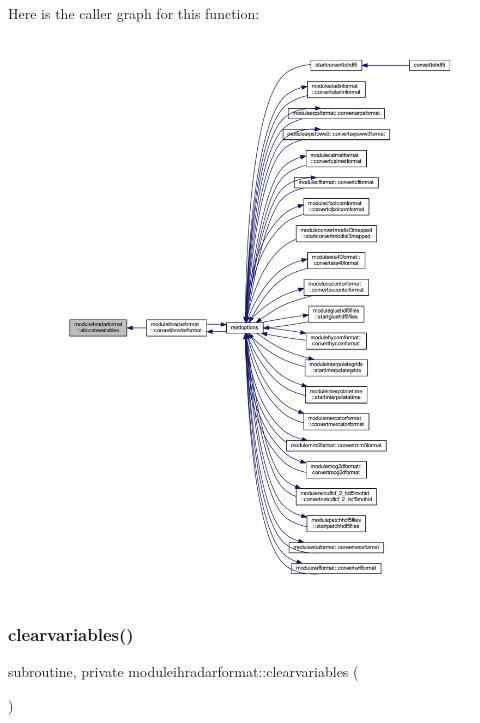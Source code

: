 Here is the caller graph for this function\+:\nopagebreak
\begin{figure}[H]
\begin{center}
\leavevmode
\includegraphics[width=350pt]{namespacemoduleihradarformat_a5e6d5ce963365079322d81b8c5030265_icgraph}
\end{center}
\end{figure}
\mbox{\label{namespacemoduleihradarformat_a1116a7a33c3cd3f0002a36a069bd6df9}} 
\subsubsection{\texorpdfstring{clearvariables()}{clearvariables()}}
{\footnotesize\ttfamily subroutine, private moduleihradarformat\+::clearvariables (\begin{DoxyParamCaption}{ }\end{DoxyParamCaption})\hspace{0.3cm}{\ttfamily [private]}}

